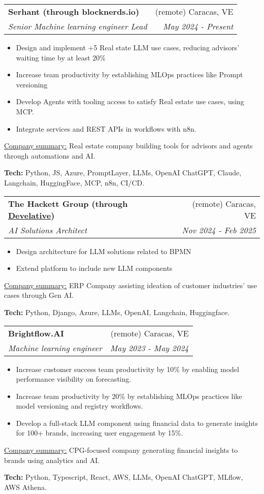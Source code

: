 \documentclass[letterpaper,11pt]{article}
\makeatletter
\newcommand{\sepsection}{\vspace{25pt}}
\newcommand{\resumeItem}[1]{%
  \item\small{
    #1
  }
}
\newcommand{\resumeSubheading}[4]{
  \vspace{8pt}\item%
    \begin{tabular*}{0.97\textwidth}[t]{l@{\extracolsep{\fill}}r}
      \textbf{#1} & #2 \\
      \textit{\small#3} & \textit{\small #4} \\
    \end{tabular*}\vspace{-5pt}
}
\newcommand{\resumeItemListStart}{\begin{itemize}}
\newcommand{\resumeItemListEnd}{\end{itemize}\vspace{-5pt}}
\newcommand{\resumeTech}[2]{
 \underline{#1:} #2
}
\makeatother
\begin{document}
    \resumeSubheading
      {Serhant (through blocknerds.io)}{(remote) Caracas, VE}
      {Senior Machine learning engineer Lead}{May 2024 - Present}
      \resumeItemListStart
      \resumeItem{Design and implement +5 Real state LLM use cases, reducing advisors' waiting time by at least 20\%}
      \resumeItem{Increase team productivity by establishing MLOps practices like Prompt versioning}
      \resumeItem{Develop Agents with tooling access to satisfy Real estate use cases, using MCP.}
      \resumeItem{Integrate services and REST APIs in workflows with n8n.}
      \resumeItemListEnd
      \resumeTech{Company summary}{Real estate company building tools for advisors and agents through automations and AI.}
      \begin{tcolorbox}
        \textbf{Tech:} Python, JS, Azure, PromptLayer, LLMs, OpenAI ChatGPT, Claude, Langchain, HuggingFace, MCP, n8n, CI/CD.
      \end{tcolorbox}

    \sepsection
    
    \resumeSubheading
      {The Hackett Group (through \href{https://www.develative.com/}{Develative})}{(remote) Caracas, VE}
      {AI Solutions Architect}{Nov 2024 - Feb 2025}
      \resumeItemListStart
      \resumeItem{Design architecture for LLM solutions related to BPMN}
      \resumeItem{Extend platform to include new LLM components}
      \resumeItemListEnd
      \resumeTech{Company summary}{ERP Company assisting ideation of customer industries' use cases through Gen AI.}
      \begin{tcolorbox}[width=.67\linewidth]
          \textbf{Tech:} Python, Django, Azure, LLMs, OpenAI, Langchain, Huggingface.
      \end{tcolorbox}

    \sepsection

    \resumeSubheading
      {Brightflow.AI}{(remote) Caracas, VE}
      {Machine learning engineer}{May 2023 - May 2024}
      \resumeItemListStart
      \resumeItem{Increase customer success team productivity by 10\% by enabling model performance visibility on forecasting.}
      \resumeItem{Increase team productivity by 20\% by establishing MLOps practices like model versioning and registry workflows.}
      \resumeItem{Develop a full-stack LLM component using financial data to generate insights for 100+ brands, increasing user engagement by 15\%.}
      \resumeItemListEnd
      \resumeTech{Company summary}{CPG-focused company generating financial insights to brands using analytics and AI.}
      \begin{tcolorbox}[width=.82\linewidth]
          \textbf{Tech:} Python, Typescript, React, AWS, LLMs, OpenAI ChatGPT, MLflow, AWS Athena.
      \end{tcolorbox}
    \sepsection
\end{document}
